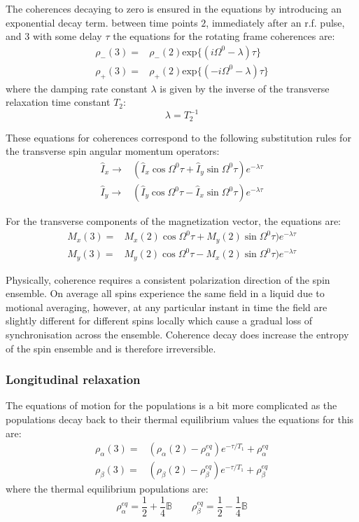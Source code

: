 The coherences decaying to zero is ensured in the equations by introducing an exponential decay term.
between time points $2$, immediately after an r.f. pulse, and $3$ with some delay $\tau$ the
equations for the rotating frame coherences are:
\begin{align}\label{eqn:coherencetime}
  \rho_-(3) =& \rho_-(2)\text{exp}\{(i\Omega^0 - \lambda)\tau\}\\
  \rho_+(3) =& \rho_+(2)\text{exp}\{(-i\Omega^0 - \lambda)\tau\}
\end{align}
where the damping rate constant $\lambda$ is given by the inverse of the
transverse relaxation time constant $T_2$:
\begin{equation}
  \lambda = T_2^{-1}
\end{equation}

These equations for coherences correspond to the following substitution rules
for the transverse spin angular momentum operators:
\begin{align}
  \hat{I}_x \rightarrow& (\hat{I}_x\cos\Omega^0\tau + \hat{I}_y\sin\Omega^0\tau)e^{-\lambda\tau}\\
  \hat{I}_y \rightarrow& (\hat{I}_y\cos\Omega^0\tau - \hat{I}_x\sin\Omega^0\tau)e^{-\lambda\tau}
\end{align}

For the transverse components of the magnetization vector, the equations are:
\begin{align}
  M_x(3) =& M_x(2)\cos\Omega^0\tau + M_y(2)\sin\Omega^0\tau)e^{-\lambda\tau}\\
  M_y(3) =& M_y(2)\cos\Omega^0\tau - M_x(2)\sin\Omega^0\tau)e^{-\lambda\tau}
\end{align}

Physically, coherence requires a consistent polarization direction of the spin ensemble. On
average all spins experience the same field in a liquid due to motional averaging, however, at
any particular instant in time the field are slightly different for different spins locally which
cause a gradual loss of synchronisation across the ensemble. Coherence decay does increase the entropy
of the spin ensemble and is therefore irreversible.

\subsubsection{Longitudinal relaxation}

The equations of motion for the populations is a bit more complicated as the populations decay back
to their thermal equilibrium values the equations for this are:
\begin{align}
  \rho_\alpha(3) =& (\rho_\alpha(2)-\rho_\alpha^{eq})e^{-\tau/T_1} + \rho_\alpha^{eq} \\
  \rho_\beta(3) =& (\rho_\beta(2)-\rho_\beta^{eq})e^{-\tau/T_1} + \rho_\beta^{eq}
\end{align}
where the thermal equilibrium populations are:
\begin{equation}
  \rho_\alpha^{eq} = \frac{1}{2} + \frac{1}{4}\mathbb{B} \qquad \rho_\beta^{eq} = \frac{1}{2} - \frac{1}{4}\mathbb{B}
\end{equation}

